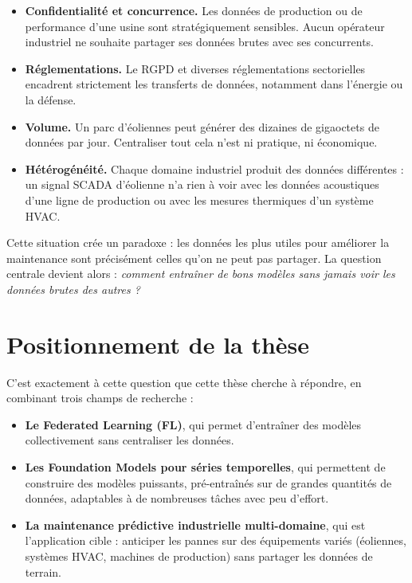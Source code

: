 \documentclass[12pt, a4paper]{report}
\begin{document}
\begin{itemize}
  \item \textbf{Confidentialité et concurrence.} Les données de production ou de
  performance d'une usine sont stratégiquement sensibles. Aucun opérateur industriel
  ne souhaite partager ses données brutes avec ses concurrents.
  \item \textbf{Réglementations.} Le RGPD et diverses réglementations sectorielles
  encadrent strictement les transferts de données, notamment dans l'énergie ou la défense.
  \item \textbf{Volume.} Un parc d'éoliennes peut générer des dizaines de gigaoctets
  de données par jour. Centraliser tout cela n'est ni pratique, ni économique.
  \item \textbf{Hétérogénéité.} Chaque domaine industriel produit des données différentes :
  un signal SCADA d'éolienne n'a rien à voir avec les données acoustiques d'une ligne
  de production ou avec les mesures thermiques d'un système HVAC.
\end{itemize}

Cette situation crée un paradoxe : les données les plus utiles pour améliorer la
maintenance sont précisément celles qu'on ne peut pas partager. La question centrale
devient alors : \textit{comment entraîner de bons modèles sans jamais voir les données
brutes des autres ?}

\section{Positionnement de la thèse}

C'est exactement à cette question que cette thèse cherche à répondre, en combinant
trois champs de recherche :

\begin{itemize}
  \item \textbf{Le Federated Learning (FL)}, qui permet d'entraîner des modèles
  collectivement sans centraliser les données.
  \item \textbf{Les Foundation Models pour séries temporelles}, qui permettent de
  construire des modèles puissants, pré-entraînés sur de grandes quantités de données,
  adaptables à de nombreuses tâches avec peu d'effort.
  \item \textbf{La maintenance prédictive industrielle multi-domaine}, qui est
  l'application cible : anticiper les pannes sur des équipements variés (éoliennes,
  systèmes HVAC, machines de production) sans partager les données de terrain.
\end{itemize}
\end{document}

